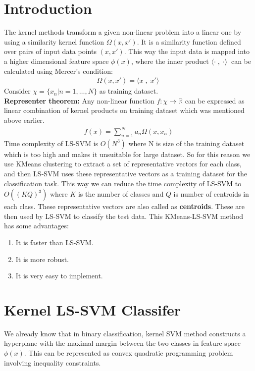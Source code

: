 \documentclass[conference]{IEEEtran}
\begin{document}
    \section{Introduction}\label{sec:introduction}
    The kernel methods transform a given non-linear problem into a linear one by using a similarity kernel function $\Omega(x,x\prime)$.
    It is a similarity function defined over pairs of input data points $(x, x\prime)$.
    This way the input data is mapped into a higher dimensional feature space  $\phi(x)$, where the inner product $ \langle\cdot\;,\;\cdot\rangle\ $ can be calculated using Mercer's condition:
    \begin{align}
        \Omega(x,x\prime) = \langle x \;,\; x\prime\rangle\
    \end{align}
    Consider $\chi = \{x_{n} | n=1,\ldots,N\}$ as training dataset. \\
    \textbf{Representer theorem:} Any non-linear function $f : \chi \longrightarrow \mathbb{R}$ can be expressed as linear combination of kernel products on training dataset which was mentioned above earlier.
    \begin{align}
        f(x) = \sum_{n=1}^{N} a_{n}\Omega(x,x_{n})
    \end{align}
    Time complexity of LS-SVM is $O(N^3)$ where N is size of the training dataset which is too high and makes it unsuitable for large dataset.
    So for this reason we use KMeans clustering to extract a set of representative vectors for each class, and then LS-SVM uses these representative vectors as a training dataset for the classification task.
    This way we can reduce the time complexity of LS-SVM to $O((KQ)^3)$ where $K$ is the number of classes and $Q$ is number of centroids in each class.
    These representative vectors are also called as \textbf{centroids}.
    These are then used by LS-SVM to classify the test data.
    This KMeans-LS-SVM method has some advantages:
    \begin{enumerate}
        \item It is faster than LS-SVM.
        \item It is more robust.
        \item It is very easy to implement.
    \end{enumerate}


    \section{Kernel LS-SVM Classifer}\label{sec:kernel-ls-svm-classifer}
    We already know that in binary classification, kernel SVM method constructs a hyperplane with the maximal margin
    between the two classes in feature space $ \phi(x) $.
    This can be represented as convex quadratic programming problem
    involving inequality constraints.
\end{document}
